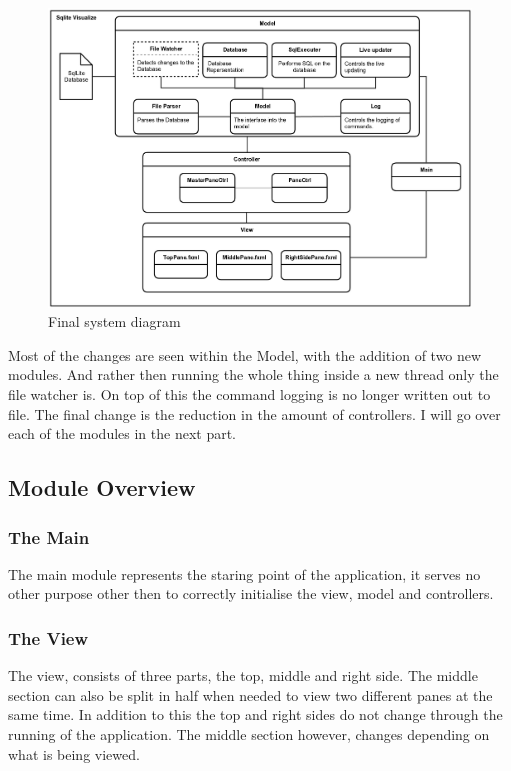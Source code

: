 \begin{figure}[H]
	\centering
	\includegraphics[scale=0.2]{images/system_diagram_new.png}
	\caption{Final system diagram}
	\label{fig:design_new}
\end{figure}

Most of the changes are seen within the Model, with the addition of two new modules. And rather then running the whole thing inside a new thread only the file watcher is. On top of this the command logging is no longer written out to file. The final change is the reduction in the amount of controllers. I will go over each of the modules in the next part.

\subsection{Module Overview}
\label{subsec:module_overview}

\subsubsection{The Main}
\label{subsubsec:main}

The main module represents the staring point of the application, it serves no other purpose other then to correctly initialise the view, model and controllers.

\subsubsection{The View}
\label{subsubsec:the_view}

The view, consists of three parts, the top, middle and right side. The middle section can also be split in half when needed to view two different panes at the same time. In addition to this the top and right sides do not change through the running of the application. The middle section however, changes depending on what is being viewed.

